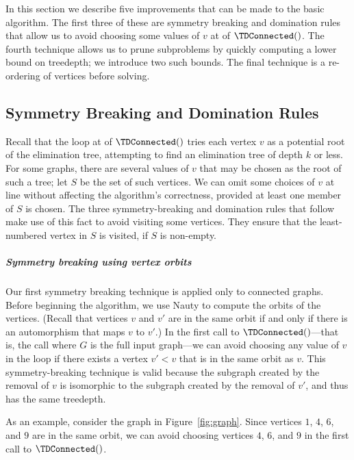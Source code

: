 {    In this section we describe five improvements that can be made to the basic algorithm.
    The first three of these are symmetry breaking and domination rules that
    allow us to avoid choosing some values of $v$ at  of
    $\TDConnected()$.
    The fourth technique allows us to prune subproblems by quickly computing a lower bound
    on treedepth; we introduce two such bounds.  The final technique is a re-ordering of vertices before solving.

    \subsection{Symmetry Breaking and Domination Rules}

    Recall that the loop at  of $\TDConnected()$ tries each vertex $v$ as a
    potential root of the elimination tree, attempting to find an elimination tree of depth $k$ or less.
    For some graphs, there are several values of $v$ that may be chosen as the root of such a tree;
    let $S$ be the set of such vertices.  We can omit some choices of
    $v$ at line  without affecting the algorithm's correctness,
    provided at least one member of $S$ is chosen.  The three
    symmetry-breaking and domination rules that follow make use of this fact to avoid visiting
    some vertices. They ensure that the least-numbered vertex in $S$ is visited, if $S$ is non-empty.


    \subparagraph*{Symmetry breaking using vertex orbits}

    Our first symmetry breaking technique is applied only to connected graphs.
    Before beginning the algorithm, we use Nauty \cite{McKay201494} to compute the orbits
    of the vertices.  (Recall that vertices $v$ and $v'$ are in the same orbit if and
    only if there is an automorphism that maps $v$ to $v'$.)  In the first call to
    $\TDConnected()$---that is, the call where $G$ is the full input graph---we
    can avoid choosing any value of $v$ in the loop if there exists a vertex $v' < v$ that is in the
    same orbit as $v$.  This symmetry-breaking technique is valid
    because the subgraph created by the removal of $v$ is isomorphic
    to the subgraph created by the removal of $v'$, and thus has the same treedepth.

    As an example, consider the graph in Figure~\ref{fig:graph}.  Since vertices $1$, $4$, $6$, and $9$
    are in the same orbit, we can avoid choosing vertices $4$, $6$, and $9$ in the
    first call to $\TDConnected()$.

}
